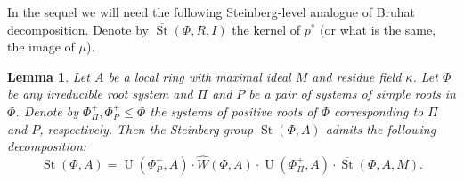 \documentclass[oneside, 10pt]{amsart}
\DeclareMathOperator{\St}{St}
\DeclareMathOperator{\UU}{U}
\newcommand{\StW}{\widehat{W}}
\newcommand{\StH}{\widehat{H}}
\numberwithin{equation}{section}
\numberwithin{thm}{section}
\newtheorem{lemma}[thm]{Lemma}
\numberwithin{lemma}{section}
\theoremstyle{definition}
\theoremstyle{remark}
\begin{document}
In the sequel we will need the following Steinberg-level analogue of Bruhat decomposition.
Denote by $\overline{\St}(\Phi, R, I)$ the kernel of $p^*$ (or what is the same, the image of $\mu$).
\begin{lemma}\label{lem:bruhat}
Let $A$ be a local ring with maximal ideal $M$ and residue field $\kappa$.
Let $\Phi$ be any irreducible root system and $\Pi$ and $P$ be a pair of systems of simple roots in $\Phi$.
Denote by $\Phi^+_\Pi, \Phi^+_{P} \leq \Phi$ the systems of positive roots of $\Phi$ corresponding to $\Pi$ and $P$, respectively.
Then the Steinberg group $\St(\Phi, A)$ admits the following decomposition:
\begin{equation}\label{eq:bruhat}
\St(\Phi,A) =\UU(\Phi^+_{P}, A)\cdot \StW(\Phi, A) \cdot \UU(\Phi^+_{\Pi}, A) \cdot \overline{\St}(\Phi, A, M).
\end{equation}
\begin{comment}
Moreover, if for some $u,u'\in \UU(\Phi^{+}_{P}, A)$, $v, v' \in \UU(\Phi^+_{\Pi}, A)$, $w,w'\in \StW(\Phi, A)$ and $l,l'\in \overline{\St}(\Phi, A, M)$ one has
\begin{equation} \label{eq:bwb-eq} uwvl=u'w'v'l', \end{equation} then
$\overline{w}=\overline{w'} \in W(\Phi)$ and $w^{-1}w' \in \StH(\Phi, A) \cap \overline{\St}(\Phi, A, M)$.
\end{comment}
\end{lemma}
\end{document}

